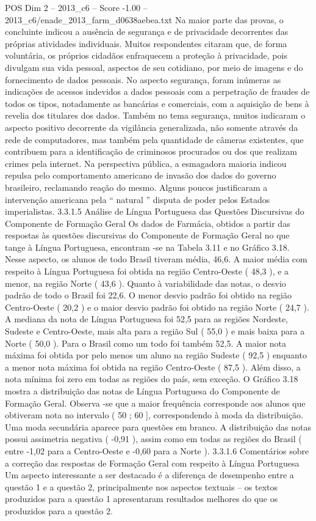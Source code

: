 \begin{textsample}{POS Dim 2 – 2013\_c6 – Score -1.00 – 2013\_c6/enade\_2013\_farm\_d0638aebea.txt}
Na maior parte das provas, o concluinte indicou a ausência de segurança e de privacidade decorrentes das próprias atividades individuais.
Muitos respondentes citaram que, de forma voluntária, os próprios cidadãos enfraquecem a proteção à privacidade, pois divulgam sua vida pessoal, aspectos de seu cotidiano, por meio de imagens e do fornecimento de dados pessoais.
No aspecto segurança, foram inúmeras as indicações de acessos indevidos a dados pessoais com a perpetração de fraudes de todos os tipos, notadamente as bancárias e comerciais, com a aquisição de bens à revelia dos titulares dos dados.
Também no tema segurança, muitos indicaram o aspecto positivo decorrente da vigilância generalizada, não somente através da rede de computadores, mas também pela quantidade de câmeras existentes, que contribuem para a identificação de criminosos procurados ou dos que realizam crimes pela internet.
Na perspectiva pública, a esmagadora maioria indicou repulsa pelo comportamento americano de invasão dos dados do governo brasileiro, reclamando reação do mesmo.
Alguns poucos justificaram a intervenção americana pela “ natural ” disputa de poder pelos Estados imperialistas. 3.3.1.5 Análise de Língua Portuguesa das Questões Discursivas do Componente de Formação Geral Os dados de Farmácia, obtidos a partir das respostas às questões discursivas do Componente de Formação Geral no que tange à Língua Portuguesa, encontram -se na Tabela 3.11 e no Gráfico 3.18.
Nesse aspecto, os alunos de todo Brasil tiveram média, 46,6.
A maior média com respeito à Língua Portuguesa foi obtida na região Centro-Oeste ( 48,3 ), e a menor, na região Norte ( 43,6 ).
Quanto à variabilidade das notas, o desvio padrão de todo o Brasil foi 22,6.
O menor desvio padrão foi obtido na região Centro-Oeste ( 20,2 ) e o maior desvio padrão foi obtido na região Norte ( 24,7 ).
A mediana da nota de Língua Portuguesa foi 52,5 para as regiões Nordeste, Sudeste e Centro-Oeste, mais alta para a região Sul ( 55,0 ) e mais baixa para a Norte ( 50,0 ).
Para o Brasil como um todo foi também 52,5.
A maior nota máxima foi obtida por pelo menos um aluno na região Sudeste ( 92,5 ) enquanto a menor nota máxima foi obtida na região Centro-Oeste ( 87,5 ).
Além disso, a nota mínima foi zero em todas as regiões do país, sem exceção.
O Gráfico 3.18 mostra a distribuição das notas de Língua Portuguesa do Componente de Formação Geral.
Observa -se que a maior frequência corresponde aos alunos que obtiveram nota no intervalo ( 50 ; 60 ], correspondendo à moda da distribuição.
Uma moda secundária aparece para questões em branco.
A distribuição das notas possui assimetria negativa ( -0,91 ), assim como em todas as regiões do Brasil ( entre -1,02 para a Centro-Oeste e -0,60 para a Norte ). 3.3.1.6 Comentários sobre a correção das respostas de Formação Geral com respeito à Língua Portuguesa Um aspecto interessante a ser destacado é a diferença de desempenho entre a questão 1 e a questão 2, principalmente nos aspectos textuais – os textos produzidos para a questão 1 apresentaram resultados melhores do que os produzidos para a questão 2.

\end{textsample}
